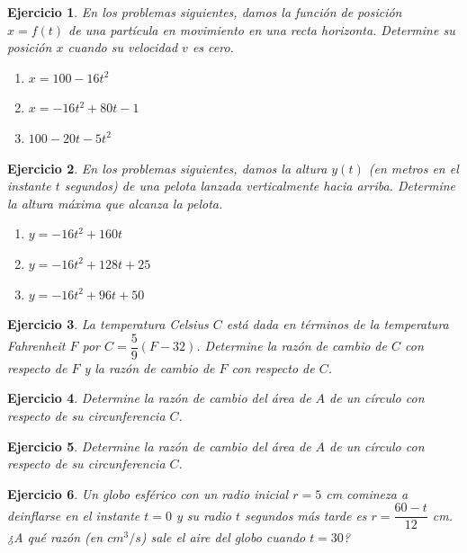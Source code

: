 \documentclass[12pt,tikz,border=5pt]{article}
\newtheorem{ejercicio}{Ejercicio}[section]
\begin{document}
\begin{ejercicio}
  En los problemas siguientes, damos la función de posición $x = f(t)$ de una partícula en movimiento en una recta horizonta. Determine su posición $x$ cuando su velocidad $v$ es cero.
  \begin{enumerate}[label=(\alph*)]
    \item $x = 100 - 16t^2$
    \item $x = -16t^2 + 80t - 1$
    \item $100- 20t - 5t^2$
  \end{enumerate}
\end{ejercicio}

\begin{ejercicio}
  En los problemas siguientes, damos la altura $y(t)$ (en metros en el instante $t$ segundos) de una pelota lanzada verticalmente hacia arriba. Determine la altura máxima que alcanza la pelota.
  \begin{enumerate}[label=(\alph*)]
    \item $y = -16t^2 + 160t$
    \item $y = -16t^2 + 128t + 25$
    \item $y = -16t^2 + 96t + 50$
  \end{enumerate}
\end{ejercicio}

\begin{ejercicio}
  La temperatura Celsius $C$ está dada en términos de la temperatura Fahrenheit $F$ por $C = \dfrac{5}{9}(F - 32)$. Determine la razón de cambio de $C$ con respecto de $F$ y la razón de cambio de $F$ con respecto de $C$.
\end{ejercicio}

\begin{ejercicio}
  Determine la razón de cambio del área de $A$ de un círculo con respecto de su circunferencia $C$.
\end{ejercicio}

\begin{ejercicio}
  Determine la razón de cambio del área de $A$ de un círculo con respecto de su circunferencia $C$.
\end{ejercicio}

\begin{ejercicio}
  Un globo esférico con un radio inicial $r = 5$ cm comineza a deinflarse en el instante $t=0$ y su radio $t$ segundos más tarde es $r =  \dfrac{60 - t}{12}$ cm. ¿A qué razón (en $cm^3/s$) sale el aire del globo cuando $t = 30$?
\end{ejercicio}
\end{document}
